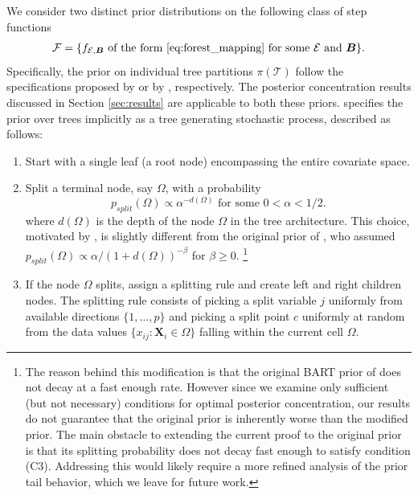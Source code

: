 \documentclass[12pt]{article}
\newcommand{\bm}[1]{\boldsymbol{#1}}
\newcommand{\mE}{\mathcal{E}}
\newcommand{\mT}{\mathcal{T}}
\newcommand{\1}{\mathbb{I}}
\def\mF{\mathcal{F}}
\def\B{\bm{B}}
\def\X{\bm{X}}
\def\B{\mbox{\boldmath$B$}}
\def\X{\mbox{\boldmath$X$}}
\def\B{\bm{B}}
\def\X{\bm{X}}
\theoremstyle{plain}
\theoremstyle{definition}
\theoremstyle{remark}
\begin{document}
We consider two distinct prior distributions on the following class of step functions
\begin{align}
\mF = \{f_{\mE,{\B}} \text{ of the form \eqref{eq:forest_mapping} for some $\mE$ and $\B$}\}.
\end{align}
Specifically, the prior on individual tree partitions $\pi(\mT)$ follow the specifications proposed by \cite{chipman1998bayesian} or by \cite{denison1998bayesian}, respectively. The posterior concentration results discussed in Section \ref{sec:results} are applicable to both these priors. \cite{chipman1998bayesian} specifies the prior over trees implicitly as a tree generating stochastic process, described as follows:
\begin{enumerate}
\item Start with a single leaf (a root node) encompassing the entire covariate space.
\item Split a terminal node, say $\Omega$, with a probability
\begin{equation}\label{eq:p_split}
p_{split}(\Omega) \propto \alpha^{-d(\Omega)} \text{ for some $0 < \alpha < 1/2$.}
\end{equation}
where $d(\Omega)$ is the depth of the node $\Omega$ in the tree architecture. This choice, motivated by \citep{rockova2019theory}, is slightly different from the original prior of \cite{chipman1998bayesian}, who assumed $p_{split}(\Omega) \propto \alpha/(1+d(\Omega))^{-\beta}$ for $\beta \ge 0$. \footnote{The reason behind this modification is that the original BART prior of \cite{chipman2010bart} does not decay at a fast enough rate. However since we examine only sufficient (but not necessary) conditions for optimal posterior concentration, our results do not guarantee that the original prior is inherently worse than the modified prior. The main obstacle to extending the current proof to the original prior is that its splitting probability does not decay fast enough to satisfy condition (C3). Addressing this would likely require a more refined analysis of the prior tail behavior, which we leave for future work.}
\item If the node $\Omega$ splits, assign a splitting rule  and create left and right children nodes. The splitting rule consists of picking a split variable $j$ uniformly from available directions $\{1,\dots, p\}$ and
picking a split point $c$ uniformly at random from the data values $\{x_{ij} : \X_i \in \Omega\}$ falling within the current cell $\Omega$.
\end{enumerate}
\end{document}
